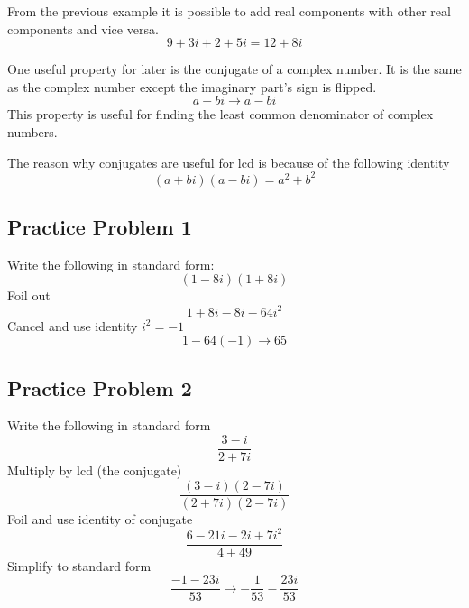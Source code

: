 \documentclass[12pt, letterpaper, oneside]{book}
\begin{document}
From the previous example it is possible to add real components with other real components and vice versa.
\[9 + 3i + 2 + 5i = 12 + 8i\]

One useful property for later is the conjugate of a complex number. It is the same as the complex number except the imaginary part's sign is flipped.
\begin{equation}
    a + bi \rightarrow a - bi
\end{equation}
This property is useful for finding the least common denominator of complex numbers.

The reason why conjugates are useful for lcd is because of the following identity
\begin{equation}
    (a + bi)(a - bi) = a^2 + b^2
\end{equation}

\subsection{Practice Problem 1}
Write the following in standard form:
\[(1-8i)(1+8i)\]
Foil out
\[1 + 8i -8i - 64i^2\]
Cancel and use identity $i^2 = - 1$
\[1 - 64(-1) \rightarrow 65\] 

\subsection{Practice Problem 2}
Write the following in standard form
\[\frac{3 - i}{2 + 7i}\]
Multiply by lcd (the conjugate)
\[\frac{(3-i)(2-7i)}{(2+7i)(2-7i)}\]
Foil and use identity of conjugate
\[\frac{6-21i-2i+7i^2}{4+49}\]
Simplify to standard form
\[\frac{-1-23i}{53} \rightarrow -\frac{1}{53} - \frac{23i}{53}\] 
\end{document}
